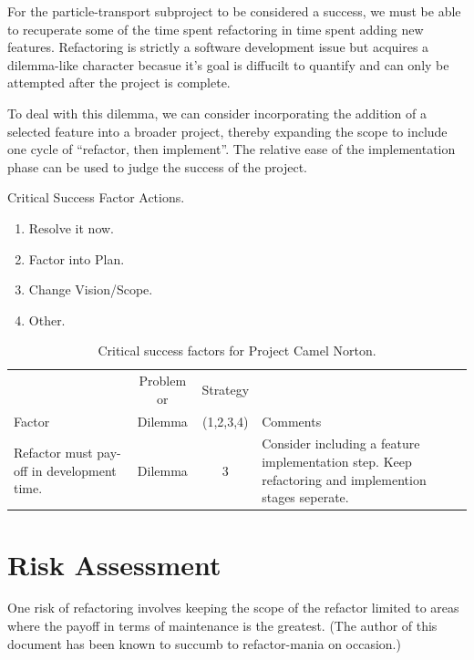 \documentclass[11pt]{nmemo}
\begin{document}
For the particle-transport subproject to be considered a success, we
must be able to recuperate some of the time spent refactoring in time
spent adding new features. Refactoring is strictly a software
development issue but acquires a dilemma-like character becasue it's
goal is diffucilt to quantify and can only be attempted after the
project is complete.

To deal with this dilemma, we can consider incorporating the addition
of a selected feature into a broader project, thereby expanding the
scope to include one cycle of ``refactor, then implement''. The
relative ease of the implementation phase can be used to judge the
success of the project.

\begin{table}[ht]
  \caption{Critical Success Factor Actions.}
    \begin{enumerate}
    \item Resolve it now.
    \item Factor into Plan.
    \item Change Vision/Scope.
    \item Other.
    \end{enumerate}
\end{table}

\begin{table}[ht]
  \begin{center}
    \caption{Critical success factors for Project Camel Norton.}
    \label{tab:critical-success}
    \begin{tabular}{|p{4.5cm}|c|c|p{4.5cm}|} 
    \hline
                       & Problem or & Strategy  &          \\
    Factor             &  Dilemma   & (1,2,3,4) & Comments \\ 
    \hline\hline
    Refactor must pay-off in development time.
    & Dilemma & 3 
    & Consider including a feature implementation step. Keep
    refactoring and implemention stages seperate. \\ 
    \hline
    \end{tabular}
  \end{center}
\end{table}


\newpage
\section*{Risk Assessment}

One risk of refactoring involves keeping the scope of the refactor
limited to areas where the payoff in terms of maintenance is the
greatest. (The author of this document has been known to succumb to
refactor-mania on occasion.)
\end{document}
